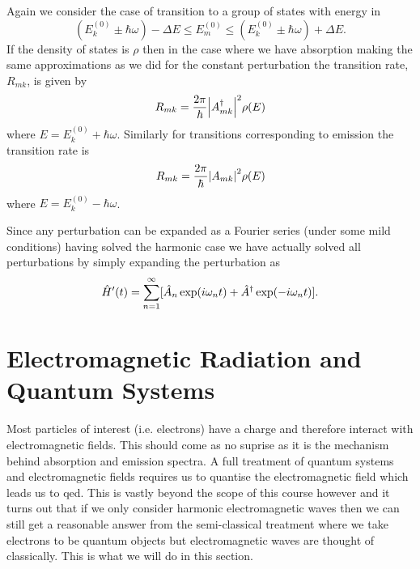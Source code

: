 \documentclass[a4paper]{article}
\begin{document}
    Again we consider the case of transition to a group of states with energy in
    \[(E_k^{(0)} \pm \hbar\omega) - \Delta E \le E_m^{(0)} \le (E_k^{(0)} \pm \hbar\omega) + \Delta E.\]
    If the density of states is \(\rho\) then in the case where we have absorption making the same approximations as we did for the constant perturbation the transition rate, \(R_{mk}\), is given by
    \[R_{mk} = \frac{2\pi}{\hbar}\abs{A_{mk}^\dagger}^2\rho(E)\]
    where \(E = E_k^{(0)} + \hbar\omega\).
    Similarly for transitions corresponding to emission the transition rate is
    \[R_{mk} = \frac{2\pi}{\hbar} \abs{A_{mk}}^2\rho(E)\]
    where \(E = E_k^{(0)} - \hbar\omega\).
    
    Since any perturbation can be expanded as a Fourier series (under some mild conditions) having solved the harmonic case we have actually solved all perturbations by simply expanding the perturbation as
    \[\hat{H}'(t) = \sum_{n=1}^{\infty} [\hat{A}_n \exp(i\omega_nt) + \hat{A}^\dagger\exp(-i\omega_nt)].\]
    
    \section{Electromagnetic Radiation and Quantum Systems}
    Most particles of interest (i.e. electrons) have a charge and therefore interact with electromagnetic fields.
    This should come as no suprise as it is the mechanism behind absorption and emission spectra.
    A full treatment of quantum systems and electromagnetic fields requires us to quantise the electromagnetic field which leads us to \gls{qed}.
    This is vastly beyond the scope of this course however and it turns out that if we only consider harmonic electromagnetic waves then we can still get a reasonable answer from the semi-classical treatment where we take electrons to be quantum objects but electromagnetic waves are thought of classically.
    This is what we will do in this section.
    
\end{document}

